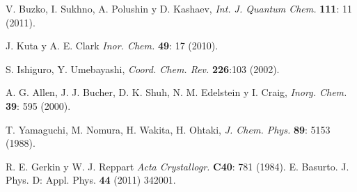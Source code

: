 
\begin{thebibliography}{XXX}

 V. Buzko, I. Sukhno, A. Polushin y D. Kashaev, 
{\em Int. J. Quantum Chem.} {\bf 111}: 11  (2011).

 J. Kuta y A. E. Clark {\em Inor. Chem.} {\bf 49}: 17 (2010).

 S. Ishiguro, Y. Umebayashi, {\em Coord. Chem. Rev.}
{\bf 226}:103 (2002).

 A. G. Allen, J. J. Bucher, D. K. Shuh, N. M. Edelstein y I. Craig, 
{\em Inorg. Chem.} {\bf 39}: 595 (2000).

 T. Yamaguchi, M. Nomura, H. Wakita, H. Ohtaki, 
{\em J. Chem. Phys.} {\bf 89}: 5153 (1988).

 R. E. Gerkin y W. J. Reppart {\em Acta Crystallogr.} {\bf C40}: 781 (1984).
E. Basurto. J. Phys. D: Appl. Phys. {\bf 44} (2011) 342001.


\end{thebibliography}
